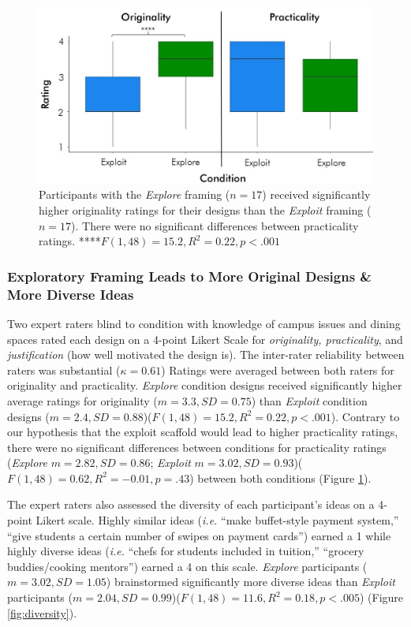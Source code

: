 \begin{figure}
\centering
  \includegraphics[width=\textwidth]{future/figures/baseline.jpg}
  \caption{Participants with the \textit{Explore} framing ($n=17$) received significantly higher originality ratings for their designs than the \textit{Exploit} framing ($n=17$). There were no significant differences between practicality ratings. ****$F(1,48)=15.2, R^2=0.22, p<.001$
}
  \label{fig:baseline}
\end{figure}

\subsubsection{Exploratory Framing Leads to More Original Designs \& More Diverse Ideas}
Two expert raters blind to condition with knowledge of campus issues and dining spaces rated each design on a 4-point Likert Scale for \textit{originality, practicality}, and \textit{justification} (how well motivated the design is). The inter-rater reliability between raters was substantial (${\kappa}=0.61$) Ratings were averaged between both raters for originality and practicality. \textit{Explore} condition designs received significantly higher average ratings for originality ($m=3.3, SD=0.75$) than \textit{Exploit} condition designs ($m=2.4, SD=0.88$)($F(1,48)=15.2, R^2=0.22, p<.001$). Contrary to our hypothesis that the exploit scaffold would lead to higher practicality ratings, there were no significant differences between conditions for practicality ratings (\textit{Explore} $m=2.82, SD=0.86$; \textit{Exploit} $m=3.02, SD=0.93$)($F(1,48)=0.62, R^2=-0.01, p=.43$) between both conditions (Figure \ref{fig:baseline}). 

The expert raters also assessed the diversity of each participant's ideas on a 4-point Likert scale. Highly similar ideas (\textit{i.e.} ``make buffet-style payment system,'' ``give students a certain number of swipes on payment cards'') earned a 1 while highly diverse ideas (\textit{i.e.} ``chefs for students included in tuition,'' ``grocery buddies/cooking mentors'') earned a 4 on this scale. \textit{Explore} participants ($m=3.02, SD=1.05$) brainstormed significantly more diverse ideas than \textit{Exploit} participants ($m=2.04, SD=0.99$)($F(1,48)=11.6, R^2=0.18, p<.005$) (Figure \ref{fig:diversity}). 

